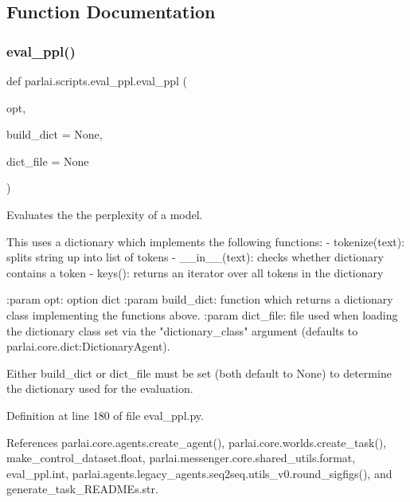 \subsection{Function Documentation}
\mbox{\label{namespaceparlai_1_1scripts_1_1eval__ppl_ad1a8a8891f276136e82edc906ea58340}} 
\subsubsection{\texorpdfstring{eval\+\_\+ppl()}{eval\_ppl()}}
{\footnotesize\ttfamily def parlai.\+scripts.\+eval\+\_\+ppl.\+eval\+\_\+ppl (\begin{DoxyParamCaption}\item[{}]{opt,  }\item[{}]{build\+\_\+dict = {\ttfamily None},  }\item[{}]{dict\+\_\+file = {\ttfamily None} }\end{DoxyParamCaption})}

\begin{DoxyVerb}Evaluates the the perplexity of a model.

This uses a dictionary which implements the following functions:
- tokenize(text): splits string up into list of tokens
- __in__(text): checks whether dictionary contains a token
- keys(): returns an iterator over all tokens in the dictionary

:param opt: option dict
:param build_dict: function which returns a dictionary class implementing
    the functions above.
:param dict_file: file used when loading the dictionary class set via the
    "dictionary_class" argument (defaults to
    parlai.core.dict:DictionaryAgent).

Either build_dict or dict_file must be set (both default to None) to
determine the dictionary used for the evaluation.
\end{DoxyVerb}
 

Definition at line 180 of file eval\+\_\+ppl.\+py.



References parlai.\+core.\+agents.\+create\+\_\+agent(), parlai.\+core.\+worlds.\+create\+\_\+task(), make\+\_\+control\+\_\+dataset.\+float, parlai.\+messenger.\+core.\+shared\+\_\+utils.\+format, eval\+\_\+ppl.\+int, parlai.\+agents.\+legacy\+\_\+agents.\+seq2seq.\+utils\+\_\+v0.\+round\+\_\+sigfigs(), and generate\+\_\+task\+\_\+\+R\+E\+A\+D\+M\+Es.\+str.

